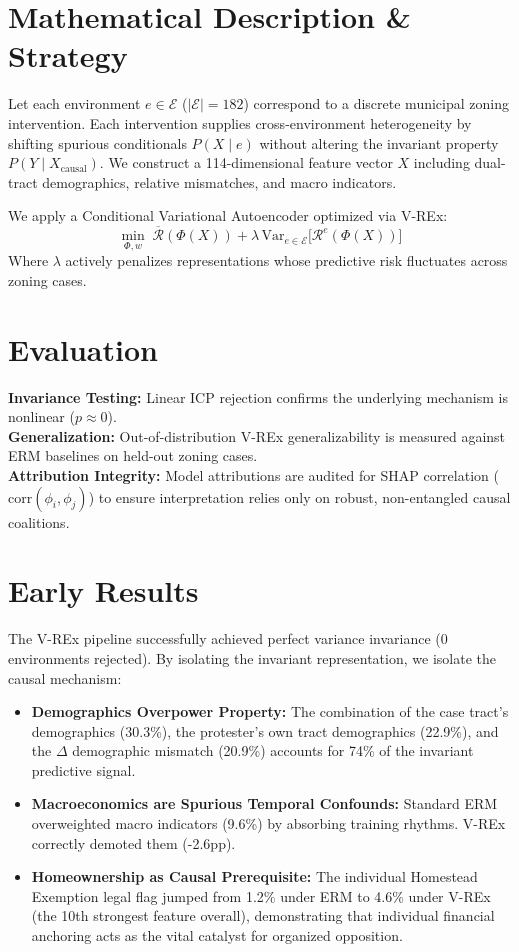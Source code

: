 \documentclass[11pt,twoside]{article}
\begin{document}
\section*{Mathematical Description \& Strategy}
Let each environment $e \in \mathcal{E}$ ($|\mathcal{E}|=182$) correspond to a discrete municipal zoning intervention. Each intervention supplies cross-environment heterogeneity \citep{peters2016icp} by shifting spurious conditionals $P(X \mid e)$ without altering the invariant property $P(Y \mid X_{\text{causal}})$. We construct a 114-dimensional feature vector $X$ including dual-tract demographics, relative mismatches, and macro indicators.

We apply a Conditional Variational Autoencoder optimized via V-REx:
\[
  \min_{\Phi, w}\;\overline{\mathcal{R}}(\Phi(X)) + \lambda\,\mathrm{Var}_{e\in\mathcal{E}}\bigl[\mathcal{R}^e(\Phi(X))\bigr]
\]
Where $\lambda$ actively penalizes representations whose predictive risk fluctuates across zoning cases.

\section*{Evaluation}
\textbf{Invariance Testing:} Linear ICP rejection confirms the underlying mechanism is nonlinear ($p \approx 0$). \\
\textbf{Generalization:} Out-of-distribution V-REx generalizability is measured against ERM baselines on held-out zoning cases. \\
\textbf{Attribution Integrity:} Model attributions are audited for SHAP correlation ($\text{corr}(\phi_i, \phi_j)$) to ensure interpretation relies only on robust, non-entangled causal coalitions.

\section*{Early Results}
The V-REx pipeline successfully achieved perfect variance invariance (0 environments rejected). By isolating the invariant representation, we isolate the causal mechanism:
\begin{itemize}
    \item \textbf{Demographics Overpower Property:} The combination of the case tract's demographics (30.3\%), the protester's own tract demographics (22.9\%), and the $\Delta$ demographic mismatch (20.9\%) accounts for 74\% of the invariant predictive signal.
    \item \textbf{Macroeconomics are Spurious Temporal Confounds:} Standard ERM overweighted macro indicators (9.6\%) by absorbing training rhythms. V-REx correctly demoted them (-2.6pp).
    \item \textbf{Homeownership as Causal Prerequisite:} The individual Homestead Exemption legal flag jumped from 1.2\% under ERM to 4.6\% under V-REx (the 10th strongest feature overall), demonstrating that individual financial anchoring acts as the vital catalyst for organized opposition.
\end{itemize}

\vspace{-0.5em}
{\scriptsize


}
\end{document}
